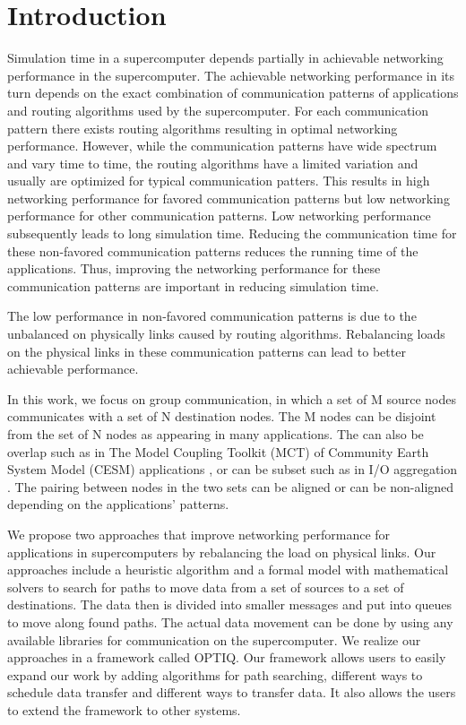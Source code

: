 \section{Introduction}
\label{sec:intro}
Simulation time in a supercomputer depends partially in achievable networking performance in the supercomputer. The achievable networking performance in its turn depends on the exact combination of communication patterns of applications and routing algorithms used by the supercomputer. For each communication pattern there exists routing algorithms resulting in optimal networking performance. However, while the communication patterns have wide spectrum and vary time to time, the routing algorithms have a limited variation and usually are optimized for typical communication patters. This results in high networking performance for favored communication patterns but low networking performance for other communication patterns. Low networking performance subsequently leads to long simulation time. Reducing the communication time for these non-favored communication patterns reduces the running time of the applications. Thus, improving the networking performance for these communication patterns are important in reducing simulation time. 

The low performance in non-favored communication patterns is due to the unbalanced on physically links caused by routing algorithms. Rebalancing loads on the physical links in these communication patterns can lead to better achievable performance. 

In this work, we focus on group communication, in which a set of M source nodes communicates with a set of N destination nodes. The M nodes can be disjoint from the set of N nodes as appearing in many applications. The can also be overlap such as in The Model Coupling Toolkit (MCT) of Community Earth System Model (CESM) applications \cite{MCT:Jacob}, or can be subset such as in I/O aggregation \cite{Vishwanath:GLEAN}. The pairing between nodes in the two sets can be aligned or can be non-aligned depending on the applications' patterns.

We propose two approaches that improve networking performance for applications in supercomputers by rebalancing the load on physical links. Our approaches include a heuristic algorithm and a formal model with mathematical solvers to search for paths to move data from a set of sources to a set of destinations. The data then is divided into smaller messages and put into queues to move along found paths. The actual data movement can be done by using any available libraries for communication on the supercomputer. We realize our approaches in a framework called OPTIQ. Our framework allows users to easily expand our work by adding algorithms for path searching, different ways to schedule data transfer and different ways to transfer data. It also allows the users to extend the framework to other systems.

